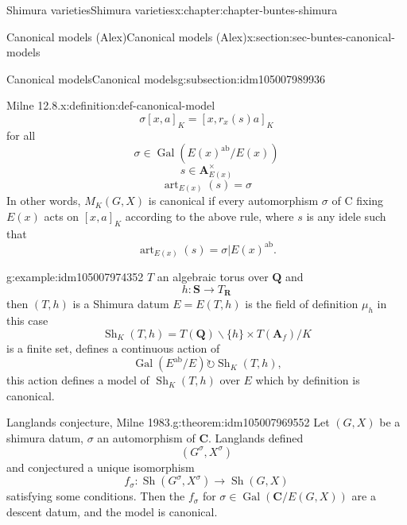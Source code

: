 \documentclass[oneside,10pt,]{book}
\numberwithin{equation}{section}
\newcommand{\lb}{[}
\newcommand{\rb}{]}
\newcommand{\QQ}{\mathbf{Q}}
\newcommand{\RR}{\mathbf{R}}
\newcommand{\CC}{\mathbf{C}}
\newcommand{\adeles}{\mathbf{A}}
\newcommand{\acts}{\circlearrowright}
\newcommand{\ab}{\mathrm{ab}}
\newcommand{\Gal}[2]{\operatorname{Gal}(#1/#2)}
\begin{document}
\begin{chapterptx}{Shimura varieties}{}{Shimura varieties}{}{}{x:chapter:chapter-buntes-shimura}
\begin{sectionptx}{Canonical models (Alex)}{}{Canonical models (Alex)}{}{}{x:section:sec-buntes-canonical-models}
\begin{subsectionptx}{Canonical models}{}{Canonical models}{}{}{g:subsection:idm105007989936}
\begin{definition}{Milne 12.8.}{x:definition:def-canonical-model}
\begin{equation*}
\sigma [x,a]_K = [x, r_x(s) a]_K
\end{equation*}
for all%
\begin{equation*}
\sigma \in \Gal{E(x)^\ab}{E(x)}
\end{equation*}
%
\begin{equation*}
s\in \adeles^\times_{E(x)}
\end{equation*}
%
\begin{equation*}
{\operatorname{art}}_{E(x)}(s) = \sigma
\end{equation*}
In other words, \(M_K(G,X)\) is canonical if every automorphism \(\sigma\) of C fixing \(E(x)\) acts on \(\lb x,a\rb_K\) according to the above rule, where \(s\) is any idele such that%
\begin{equation*}
{\operatorname{art}}_{E(x)}(s) = \sigma| E(x)^{\ab}\text{.}
\end{equation*}
%
\end{definition}
\begin{example}{}{g:example:idm105007974352}%
\(T \) an algebraic torus over \(\QQ\) and%
\begin{equation*}
h \colon \mathbf S \to T_\RR
\end{equation*}
then  \((T,h)\) is a Shimura datum \(E = E(T,h)\) is the field of definition \(\mu_h\) in this case%
\begin{equation*}
{\operatorname{Sh}}_K(T,h) = T(\QQ) \backslash \{h\}  \times T(\adeles_f) / K
\end{equation*}
is a finite set, defines a continuous action of%
\begin{equation*}
\Gal{E^\ab}{E} \acts {\operatorname{Sh}}_K(T,h)\text{,}
\end{equation*}
this action defines a model of \({\operatorname{Sh}}_K(T, h)\) over \(E\) which by definition is canonical.%
\end{example}
\begin{theorem}{Langlands conjecture, Milne 1983.}{}{g:theorem:idm105007969552}%
Let \((G,X)\) be a shimura datum, \(\sigma\) an automorphism of \(\CC\). Langlands defined%
\begin{equation*}
(G^\sigma, X^\sigma)
\end{equation*}
and conjectured a unique isomorphism%
\begin{equation*}
f_\sigma \colon {\operatorname{Sh}}(G^\sigma, X^\sigma) \to {\operatorname{Sh}}(G,X)
\end{equation*}
satisfying some conditions. Then the \(f_\sigma\) for \(\sigma\in \Gal{\CC}{E(G,X)}\) are a descent datum, and the model is canonical.%

\end{theorem}
\end{subsectionptx}
\end{sectionptx}
\end{chapterptx}
\end{document}
